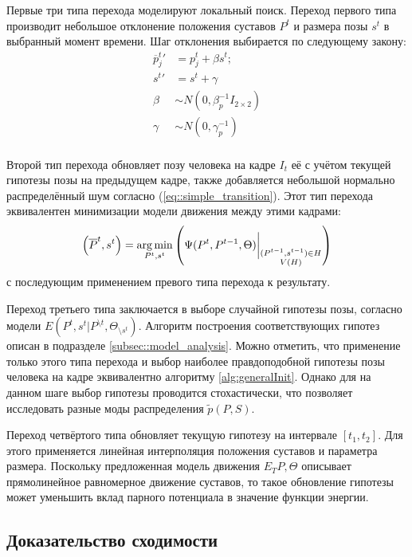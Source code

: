 Первые три типа перехода моделируют локальный поиск. Переход первого типа производит небольшое отклонение положения суставов $P^t$ и размера позы $s^t$ в выбранный момент времени. Шаг отклонения выбирается по следующему закону:
\begin{equation} \label{eq::simple_transition}
	\begin{aligned}
		{\overline{p}^t_j}' &= p^t_j + \beta s^t; \\
		{s^t}' &= s^t + \gamma \\
		\beta &\sim N(0, \beta_p^{-1} I_{2 \times 2}) \\
		\gamma &\sim N(0, \gamma_p^{-1}) \\
	\end{aligned}
\end{equation}

Второй тип перехода обновляет позу человека на кадре $I_t$ её с учётом текущей гипотезы позы на предыдущем кадре, также добавляется небольшой нормально распределённый шум согласно (\ref{eq::simple_transition}). Этот тип перехода эквивалентен минимизации модели движения между этими кадрами:
\begin{equation}
	\left(\overline{P}^t, s^t\right) = \operatorname*{arg\,min}_{P^t, s^t}\left(\Psi(P^t, P^{t-1}, \Theta)\bigg\rvert_{\substack{(P^{t-1}, s^{t-1}) \in H \\ V(H)}}\right)
\end{equation}
с последующим применением превого типа перехода к результату.

Переход третьего типа заключается в выборе случайной гипотезы позы, согласно модели $E(P^t, s^t | P^{\setminus t}, \Theta_{\setminus s^t})$. Алгоритм построения соответствующих гипотез описан в подразделе \ref{subsec::model_analysis}. Можно отметить, что применение только этого типа перехода и выбор наиболее правдоподобной гипотезы позы человека на кадре эквивалентно алгоритму \ref{alg:generalInit}. Однако для на данном шаге выбор гипотезы проводится стохастически, что позволяет исследовать разные моды распределения $\tilde{p}(P, S)$.

Переход четвёртого типа обновляет текущую гипотезу на интервале $\left[t_1, t_2\right]$. Для этого применяется линейная интерполяция положения суставов и параметра размера. Поскольку предложенная модель движения $E_T{P, \Theta}$ описывает прямолинейное равномерное движение суставов, то такое обновление гипотезы может уменьшить вклад парного потенциала в значение функции энергии.

\subsection{Доказательство сходимости}
